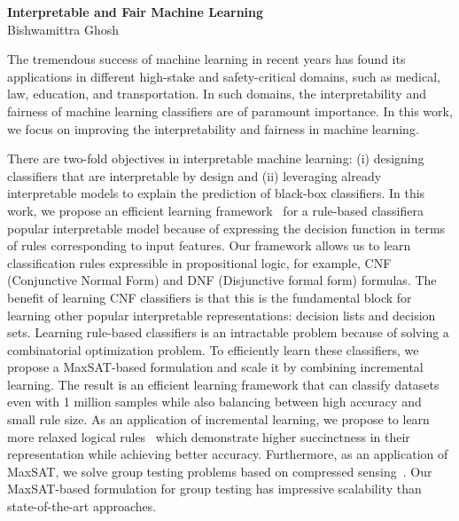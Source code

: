\documentclass{article}
\begin{document}
	\begin{center}
		\Large \textbf{Interpretable and Fair Machine Learning} \\
		\vspace{1em}
		\large Bishwamittra Ghosh
	\end{center}
	
	\vspace{1em}
	The tremendous success of machine learning in recent years has found its applications in different high-stake and  safety-critical domains, such as medical, law, education, and transportation. In such domains, the interpretability and fairness of machine learning classifiers are of paramount importance. In this work, we focus on improving the interpretability and fairness in machine learning. 
	
	There are two-fold objectives in interpretable machine learning: (i) designing classifiers that are interpretable by design and (ii) leveraging already interpretable models to explain the prediction of black-box classifiers. In this work, we propose an efficient learning framework~\cite{ghosh19incremental} for a rule-based classifier\textemdash a popular interpretable model because of expressing the decision function in terms of rules corresponding to input features.  Our framework allows us to learn classification rules expressible in propositional logic, for example, CNF (Conjunctive Normal Form) and DNF (Disjunctive formal form) formulas.  The benefit of learning CNF classifiers is that this is the fundamental block for learning other popular interpretable representations: decision lists and decision sets. Learning rule-based classifiers is an intractable problem because of solving a combinatorial optimization problem. To efficiently learn these classifiers, we propose a MaxSAT-based formulation and scale it by combining incremental learning. The result is an efficient learning framework that can classify datasets even with 1 million samples while also balancing between high accuracy and small rule size. As an application of incremental learning, we propose to learn more relaxed logical rules~\cite{ghosh20classification} which demonstrate higher succinctness in their representation while achieving better accuracy. Furthermore, as an application of MaxSAT, we solve group testing problems based on compressed sensing~\cite{ciampiconi20maxsat}. Our MaxSAT-based formulation for group testing has impressive scalability than state-of-the-art approaches. 
	
	
	
\end{document}
